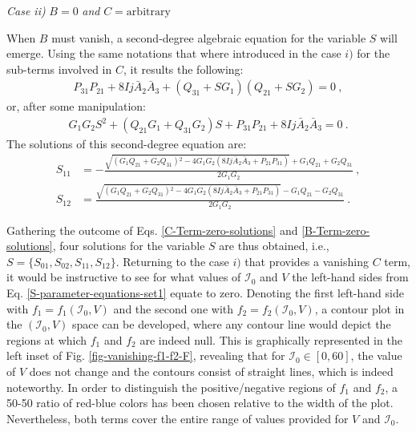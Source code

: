 \textit{Case ii)} $B=0$ \textit{and} $C=\text{arbitrary}$

When $B$ must vanish, a second-degree algebraic equation for the variable $S$ will emerge. Using the same notations that where introduced in the case $i)$ for the sub-terms involved in $C$, it results the following:
\begin{align}
    P_{31}P_{21}+8Ij\bar{A}_2\bar{A}_3+\left(Q_{31}+SG_1\right)\left(Q_{21}+SG_2\right)=0\ , \nonumber
\end{align}
or, after some manipulation:
\begin{align}
    G_1G_2S^2+\left(Q_{21}G_1+Q_{31}G_2\right)S+P_{31}P_{21}+8Ij\bar{A}_2\bar{A}_3=0\ .
    \label{S-parameter-equations-set2}
\end{align}
The solutions of this second-degree equation are:
\begin{align}
    S_{11}&=-\frac{\sqrt{\left(G_1 Q_{21}+G_2 Q_{31}\right){}^2-4 G_1 G_2 \left(8 I j \bar{A}_2 \bar{A}_3+P_{21} P_{31}\right)}+G_1 Q_{21}+G_2 Q_{31}}{2 G_1 G_2}\ ,\nonumber\\
    S_{12}&=\frac{\sqrt{\left(G_1 Q_{21}+G_2 Q_{31}\right){}^2-4 G_1 G_2 \left(8 I j \bar{A}_2 \bar{A}_3+P_{21} P_{31}\right)}-G_1 Q_{21}-G_2 Q_{31}}{2 G_1 G_2}\ .
    \label{B-Term-zero-solutions}
\end{align}

Gathering the outcome of Eqs. \ref{C-Term-zero-solutions} and \ref{B-Term-zero-solutions}, four solutions for the variable $S$ are thus obtained, i.e., $S=\{S_{01},S_{02},S_{11},S_{12}\}$. Returning to the case $i)$ that provides a vanishing $C$ term, it would be instructive to see for what values of $\mathcal{I}_0$ and $V$ the left-hand sides from Eq. \ref{S-parameter-equations-set1} equate to zero. Denoting the first left-hand side with $f_1=f_1(\mathcal{I}_0,V)$ and the second one with $f_2=f_2(\mathcal{I}_0,V)$, a contour plot in the $(\mathcal{I}_0,V)$ space can be developed, where any contour line would depict the regions at which $f_1$ and $f_2$ are indeed null. This is graphically represented in the left inset of Fig. \ref{fig-vanishing-f1-f2-F}, revealing that for $\mathcal{I}_0\in[0,60]$, the value of $V$ does not change and the contours consist of straight lines, which is indeed noteworthy. In order to distinguish the positive/negative regions of $f_1$ and $f_2$, a 50-50 ratio of red-blue colors has been chosen relative to the width of the plot. Nevertheless, both terms cover the entire range of values provided for $V$ and $\mathcal{I}_0$.

